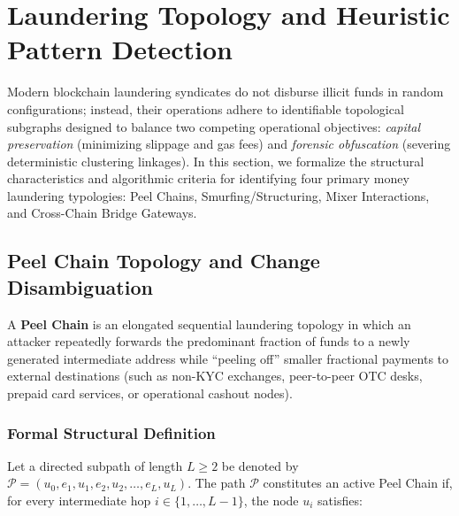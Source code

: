 \section{Laundering Topology and Heuristic Pattern Detection}
\label{sec:pattern_detection}

Modern blockchain laundering syndicates do not disburse illicit funds in random configurations; instead, their operations adhere to identifiable topological subgraphs designed to balance two competing operational objectives: \emph{capital preservation} (minimizing slippage and gas fees) and \emph{forensic obfuscation} (severing deterministic clustering linkages). In this section, we formalize the structural characteristics and algorithmic criteria for identifying four primary money laundering typologies: Peel Chains, Smurfing/Structuring, Mixer Interactions, and Cross-Chain Bridge Gateways.

\subsection{Peel Chain Topology and Change Disambiguation}

A \textbf{Peel Chain} is an elongated sequential laundering topology in which an attacker repeatedly forwards the predominant fraction of funds to a newly generated intermediate address while ``peeling off'' smaller fractional payments to external destinations (such as non-KYC exchanges, peer-to-peer OTC desks, prepaid card services, or operational cashout nodes).

\subsubsection{Formal Structural Definition}
Let a directed subpath of length $L \ge 2$ be denoted by $\mathcal{P} = (u_0, e_1, u_1, e_2, u_2, \dots, e_L, u_L)$. The path $\mathcal{P}$ constitutes an active Peel Chain if, for every intermediate hop $i \in \{1, \dots, L-1\}$, the node $u_i$ satisfies:

